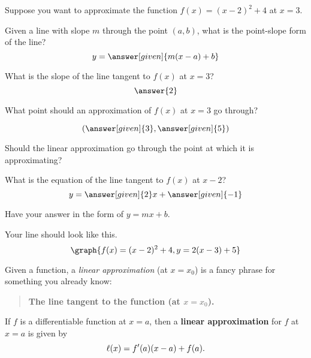 \documentclass[handout,nooutcomes]{ximera}
\begin{document}
\begin{example}
Suppose you want to approximate the function $f(x) = (x-2)^2  + 4$ at $x=3$.

Given a line with slope $m$ through the point $(a, b)$, what is the point-slope form of the line?
\[
y = \answer[given]{m(x - a) + b}
\]

What is the slope of the line tangent to $f(x)$ at $x=3$?
\[
\answer{2}
\]

\begin{problem}
What point should an approximation of $f(x)$ at $x=3$ go through?

\[
(\answer[given]{3}, \answer[given]{5})
\]
\begin{hint}
Should the linear approximation go through the point at which it is approximating?
\end{hint}
\end{problem}

\begin{problem}
What is the equation of the line tangent to $f(x)$ at $x-2$?
\[
y = \answer[given]{2}x + \answer[given]{-1}
\]
\begin{hint}
Have your answer in the form of $y=mx+b$.
\end{hint}

\begin{feedback}
Your line should look like this.
\[
\graph{f(x) = (x-2)^2+4, y = 2(x-3) + 5}
\]
\end{feedback}
\end{problem}





Given a function, a \textit{linear approximation} (at $x=x_0$) is a fancy phrase
for something you already know:
\begin{center}
\begin{quote}
  \textbf{The line tangent to the function (at $x=x_0$).}
\end{quote}
\end{center}


\begin{definition}
If $f$ is a differentiable function at $x=a$, then a \textbf{linear
  approximation} for $f$ at $x=a$ is given by
\[
\ell(x) = f'(a)(x-a) +f(a).
\]
\end{definition}



\end{example}
\end{document}
